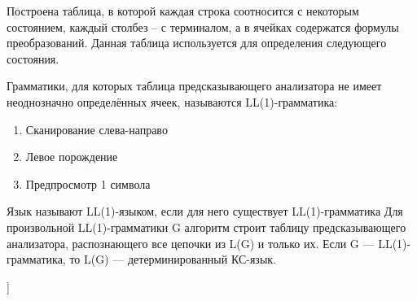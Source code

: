 Построена таблица, в которой каждая строка соотносится с некоторым состоянием, каждый столбез -- с терминалом, а в ячейках содержатся формулы преобразований. Данная таблица используется для определения следующего состояния.

Грамматики, для которых таблица предсказывающего анализатора не имеет неоднозначно определённых ячеек, называются LL(1)-грамматика:
\begin{enumerate}
\item Сканирование слева-направо
\item Левое порождение
\item Предпросмотр 1 символа
\end{enumerate}

Язык называют LL(1)-языком, если для него существует LL(1)-грамматика \newline
Для произвольной LL(1)-грамматики G алгоритм строит таблицу
предсказывающего анализатора, распознающего все цепочки из L(G) и только их.\newline
Если G — LL(1)-грамматика, то L(G) — детерминированный КС-язык.


\bigbreak
[\cite[page 69-96]{replace_me}]
